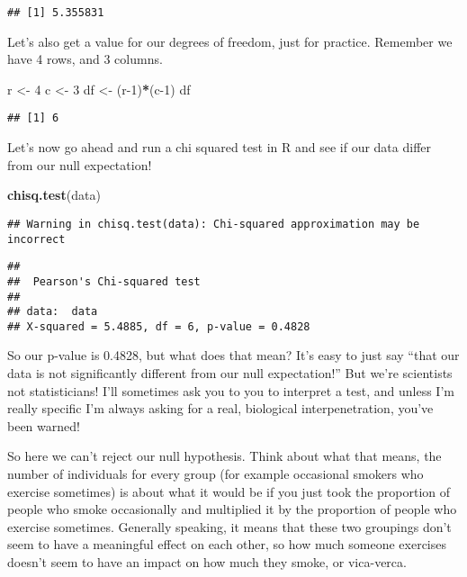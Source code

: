 \documentclass[
]{article}
\newenvironment{Shaded}{\begin{snugshade}}{\end{snugshade}}
\newcommand{\DecValTok}[1]{\textcolor[rgb]{0.00,0.00,0.81}{#1}}
\newcommand{\KeywordTok}[1]{\textcolor[rgb]{0.13,0.29,0.53}{\textbf{#1}}}
\newcommand{\NormalTok}[1]{#1}
\newcommand{\OperatorTok}[1]{\textcolor[rgb]{0.81,0.36,0.00}{\textbf{#1}}}
\newcommand{\StringTok}[1]{\textcolor[rgb]{0.31,0.60,0.02}{#1}}
\begin{document}
\begin{verbatim}
## [1] 5.355831
\end{verbatim}

Let's also get a value for our degrees of freedom, just for practice.
Remember we have 4 rows, and 3 columns.

\begin{Shaded}
\begin{Highlighting}[]
\NormalTok{r \textless{}{-}}\StringTok{ }\DecValTok{4}
\NormalTok{c \textless{}{-}}\StringTok{ }\DecValTok{3}
\NormalTok{df \textless{}{-}}\StringTok{ }\NormalTok{(r}\DecValTok{{-}1}\NormalTok{)}\OperatorTok{*}\NormalTok{(c}\DecValTok{{-}1}\NormalTok{)}
\NormalTok{df}
\end{Highlighting}
\end{Shaded}

\begin{verbatim}
## [1] 6
\end{verbatim}

Let's now go ahead and run a chi squared test in R and see if our data
differ from our null expectation!

\begin{Shaded}
\begin{Highlighting}[]
\KeywordTok{chisq.test}\NormalTok{(data)}
\end{Highlighting}
\end{Shaded}

\begin{verbatim}
## Warning in chisq.test(data): Chi-squared approximation may be incorrect
\end{verbatim}

\begin{verbatim}
## 
##  Pearson's Chi-squared test
## 
## data:  data
## X-squared = 5.4885, df = 6, p-value = 0.4828
\end{verbatim}

So our p-value is 0.4828, but what does that mean? It's easy to just say
``that our data is not significantly different from our null
expectation!'' But we're scientists not statisticians! I'll sometimes
ask you to you to interpret a test, and unless I'm really specific I'm
always asking for a real, biological interpenetration, you've been
warned!

So here we can't reject our null hypothesis. Think about what that
means, the number of individuals for every group (for example occasional
smokers who exercise sometimes) is about what it would be if you just
took the proportion of people who smoke occasionally and multiplied it
by the proportion of people who exercise sometimes. Generally speaking,
it means that these two groupings don't seem to have a meaningful effect
on each other, so how much someone exercises doesn't seem to have an
impact on how much they smoke, or vica-verca.
\end{document}
